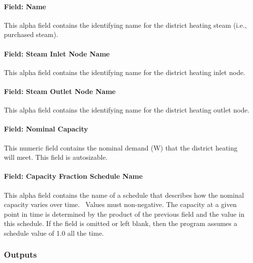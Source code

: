 \paragraph{Field: Name}\label{field-name-16-006-1}

This alpha field contains the identifying name for the district heating steam (i.e., purchased steam).

\paragraph{Field: Steam Inlet Node Name}\label{field-steam-inlet-node-name-2}

This alpha field contains the identifying name for the district heating inlet node.

\paragraph{Field: Steam Outlet Node Name}\label{field-steam-outlet-node-name-2}

This alpha field contains the identifying name for the district heating outlet node.

\paragraph{Field: Nominal Capacity}\label{field-nominal-capacity-12}

This numeric field contains the nominal demand (W) that the district heating will meet. This field is autosizable.

\paragraph{Field: Capacity Fraction Schedule Name}\label{field-capacity-fraction-schedule-name-2}

This alpha field contains the name of a schedule that describes how the nominal capacity varies over time.~ Values must non-negative. The capacity at a given point in time is determined by the product of the previous field and the value in this schedule. If the field is omitted or left blank, then the program assumes a schedule value of 1.0 all the time.

\subsubsection{Outputs}\label{outputs-15-003}

